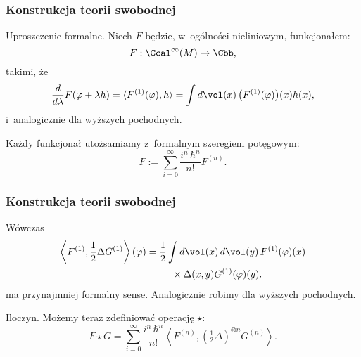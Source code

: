 \documentclass[10pt,t]{beamer}
\begin{document}
\begin{frame}
  \frametitle{Konstrukcja teorii swobodnej}


  Uproszczenie formalne. Niech $F$ będzie, w~ogólności nieliniowym,
  funkcjonałem:
  \begin{equation}
    \label{eq:Rachunek-zaburzen-09}
    F: \Ccal^{ \infty }( M ) \rightarrow \Cbb,
  \end{equation}
  takimi, że
  \begin{equation}
    \label{eq:Rachunek-zaburzen-10}
    \frac{ d }{ d \lambda } F( \varphi + \lambda h ) =
    \langle F^{ ( 1 ) }( \varphi ), h \rangle =
    \int d \vol( x ) \, \big( F^{ ( 1 ) }( \varphi ) \big)( x ) h( x ),
  \end{equation}
  i~analogicznie dla wyższych pochodnych.

  Każdy funkcjonał utożsamiamy z~formalnym szeregiem potęgowym:
  \begin{equation}
    \label{eq:Rachunek-zaburzen-11}
    F :=
    \sum\limits_{ i = 0 }^{ \infty } \frac{ i^{ n } \, \hbar^{ n } }{ n! } F^{ ( n ) }.
  \end{equation}

\end{frame}





\begin{frame}
  \frametitle{Konstrukcja teorii swobodnej}


  Wówczas
  \begin{equation}
    \label{eq:Rachunek-zaburzen-12}
    \begin{split}
      \left\langle F^{ ( 1 ) }, \frac{ 1 }{ 2 } \Delta G^{ ( 1 ) } \right\rangle( \varphi ) =
      \frac{ 1 }{ 2 }
      &\int d \vol( x ) \, d \vol( y ) \, F^{ ( 1 ) }( \varphi )( x ) \\
      &\hspace{0.5em} \times \Delta( x, y ) G^{ ( 1 ) }( \varphi )( y ).
    \end{split}
  \end{equation}
  ma przynajmniej formalny sense. Analogicznie robimy dla wyższych
  pochodnych.

  Iloczyn. Możemy teraz zdefiniować operację $\star$:
  \begin{equation}
    \label{eq:Rachunek-zaburzen-13}
    F \star G =
    \sum\limits_{ i = 0 }^{ \infty } \frac{ i^{ n } \, \hbar^{ n } }{ n! }
    \left\langle F^{ ( n ) }, \left( \tfrac{ 1 }{ 2 } \Delta \right)^{ \otimes n }
      G^{ ( n ) } \right\rangle.
  \end{equation}

\end{frame}
\end{document}
